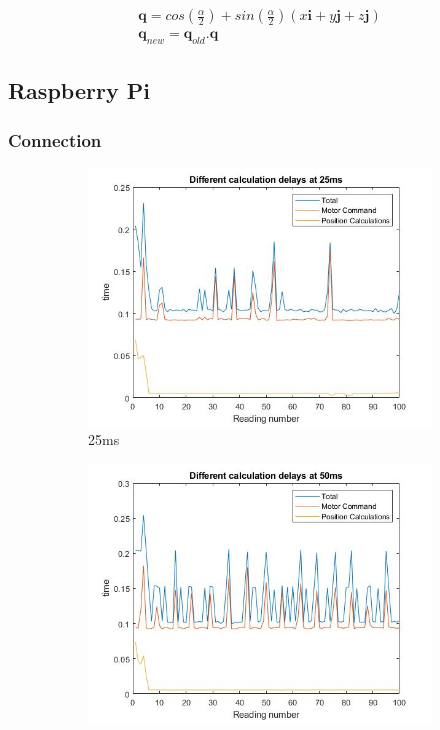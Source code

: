 \documentclass[twoside,twocolumn,12pt]{article}
\begin{document}
\begin{gather}
\textbf{q} = cos(\frac{\alpha}{2}) + sin(\frac{\alpha}{2})(x\textbf{i} + y\textbf{j} + z\textbf{j}) \nonumber \\
\textbf{q}_{new} = \textbf{q}_{old} . \textbf{q} \nonumber
\end{gather}
  
\subsection{Raspberry Pi}
\subsubsection{Connection}

\begin{figure}[t]
  \centering
  \begin{subfigure}[t]{0.325\textwidth}
    \includegraphics[width=\linewidth]{25ms_pi}
   \caption{25ms}
  \label{fig:pi25}
  \end{subfigure}
  \begin{subfigure}[t]{0.325\textwidth}
    \includegraphics[width=\linewidth]{50ms_pi}

\end{subfigure}
\end{figure}
\end{document}
